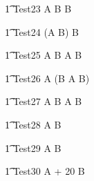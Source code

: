 
\begin{circusaction}
   \t1 Test23 \circdef  A \circseq B \circtimeout {} \rcirctime B  \\
\end{circusaction}

\begin{circusaction}
   \t1 Test24 \circdef  (A \circseq B) \circtimeout {} \rcirctime B \\
\end{circusaction}

\begin{circusaction}
   \t1 Test25 \circdef  A \circseq B \circtimeout {} \rcirctime  A \circseq B \\
\end{circusaction}

\begin{circusaction}
   \t1 Test26 \circdef  A \circseq (B \circtimeout {} \rcirctime A \circseq B)\\
\end{circusaction}

\begin{circusaction}
   \t1 Test27 \circdef  A \circtimeout {} \rcirctime B \circtimeout {} \rcirctime A \circseq B\\
\end{circusaction}


\begin{circusaction}
   \t1 Test28 \circdef  A \circtimedinterrupt {} \rcirctime B  \\
\end{circusaction}


\begin{circusaction}
   \t1 Test29 \circdef  A \circtimedinterrupt {}  \rcirctime B \\
\end{circusaction}

\begin{circusaction}
   \t1 Test30 \circdef  A \circtimedinterrupt {} + 20 \rcirctime B  \\
\end{circusaction}

